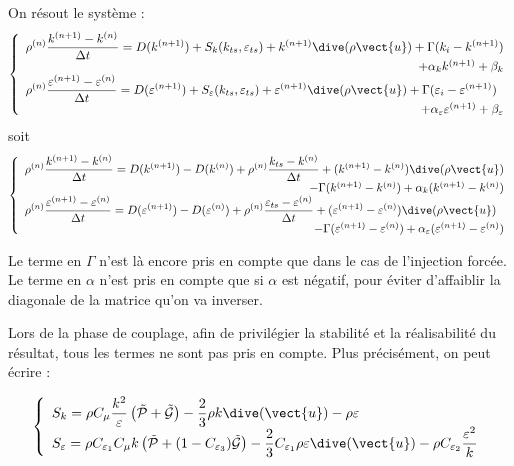 On r\'esout le syst\`eme :
\begin{equation}
\left\{\begin{array}{l}
\displaystyle
\rho^{(n)}\frac{k^{(n+1)}-k^{(n)}}{\Delta t} =
D(k^{(n+1)}) + S_k(k_{ts},\varepsilon_{ts})
+k^{(n+1)}\dive(\rho\vect{u})+\Gamma(k_i-k^{(n+1)})\\
\multicolumn{1}{r}{+\alpha_k k^{(n+1)} +\beta_k}\\
\displaystyle
\rho^{(n)}\frac{\varepsilon^{(n+1)}-\varepsilon^{(n)}}{\Delta t}  =
D(\varepsilon^{(n+1)}) + S_\varepsilon(k_{ts},\varepsilon_{ts})
+\varepsilon^{(n+1)}\dive(\rho\vect{u})
+\Gamma(\varepsilon_i-\varepsilon^{(n+1)})\\
\multicolumn{1}{r}{+\alpha_\varepsilon \varepsilon^{(n+1)} +\beta_\varepsilon}
\end{array}\right.
\end{equation}
soit
\begin{equation}
\left\{\begin{array}{l}
\displaystyle
\rho^{(n)}\frac{k^{(n+1)}-k^{(n)}}{\Delta t} =
D(k^{(n+1)})-D(k^{(n)})+\rho^{(n)}\frac{k_{ts}-k^{(n)}}{\Delta t}
+(k^{(n+1)}-k^{(n)})\dive(\rho\vect{u})\\
\multicolumn{1}{r}{-\Gamma(k^{(n+1)}-k^{(n)})+\alpha_k(k^{(n+1)}-k^{(n)})}\\
\displaystyle
\rho^{(n)}\frac{\varepsilon^{(n+1)}-\varepsilon^{(n)}}{\Delta t}  =
D(\varepsilon^{(n+1)})-D(\varepsilon^{(n)})
+\rho^{(n)}\frac{\varepsilon_{ts}-\varepsilon^{(n)}}{\Delta t}
+(\varepsilon^{(n+1)}-\varepsilon^{(n)})\dive(\rho\vect{u})\\
\multicolumn{1}{r}{-\Gamma(\varepsilon^{(n+1)}-\varepsilon^{(n)})
+\alpha_\varepsilon(\varepsilon^{(n+1)}-\varepsilon^{(n)})}
\end{array}\right.
\end{equation}

Le terme en $\Gamma$ n'est l\`a encore pris en compte que dans le cas de
l'injection forc\'ee. Le terme en $\alpha$ n'est pris en compte que si $\alpha$ est
n\'egatif, pour \'eviter d'affaiblir la diagonale de la matrice qu'on va
inverser.


Lors de la phase de couplage, afin de privil\'egier la stabilit\'e et la
r\'ealisabilit\'e du r\'esultat, tous les termes ne sont pas pris en
compte. Plus pr\'ecis\'ement, on peut \'ecrire :

\begin{equation}
\left\{\begin{array}{l}
\displaystyle
S_k =
\rho C_\mu\frac{k^2}{\varepsilon}\left(\tilde{\mathcal{P}}+\tilde{\mathcal{G}}\right)
-\frac{2}{3}\rho k \dive(\vect{u})
-\rho\varepsilon\\
\displaystyle
S_\varepsilon =
\rho C_{\varepsilon_1} C_\mu k\left(\tilde{\mathcal{P}}
+(1-C_{\varepsilon_3})\tilde{\mathcal{G}}\right)
-\frac{2}{3}C_{\varepsilon_1}\rho \varepsilon \dive(\vect{u})
-\rho C_{\varepsilon_2}\frac{\varepsilon^2}{k}
\end{array}\right.
\end{equation}

